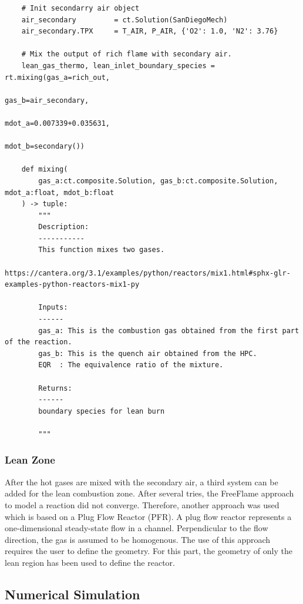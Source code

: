 \begin{verbatim}
    # Init secondarry air object
    air_secondary         = ct.Solution(SanDiegoMech)
    air_secondary.TPX     = T_AIR, P_AIR, {'O2': 1.0, 'N2': 3.76}

    # Mix the output of rich flame with secondary air.
    lean_gas_thermo, lean_inlet_boundary_species = rt.mixing(gas_a=rich_out,
                                                            gas_b=air_secondary,
                                                            mdot_a=0.007339+0.035631,
                                                            mdot_b=secondary())
    
    def mixing(
        gas_a:ct.composite.Solution, gas_b:ct.composite.Solution, mdot_a:float, mdot_b:float
    ) -> tuple:
        """
        Description:
        -----------
        This function mixes two gases.
        https://cantera.org/3.1/examples/python/reactors/mix1.html#sphx-glr-examples-python-reactors-mix1-py
    
        Inputs:
        ------
        gas_a: This is the combustion gas obtained from the first part of the reaction.
        gas_b: This is the quench air obtained from the HPC.
        EQR  : The equivalence ratio of the mixture.
    
        Returns:
        ------
        boundary species for lean burn
        
        """
\end{verbatim}

\subsubsection{Lean Zone}

After the hot gases are mixed with the secondary air, a third system can be added for the lean combustion zone. After several tries, the FreeFlame approach to model a reaction did not converge. Therefore, another approach was used which is based on a Plug Flow Reactor (PFR). A plug flow reactor represents a one-dimensional steady-state flow in a channel. Perpendicular to the flow direction, the gas is assumed to be homogenous. The use of this approach requires the user to define the geometry. For this part, the geometry of only the lean region has been used to define the reactor.


\subsection{Numerical Simulation}

